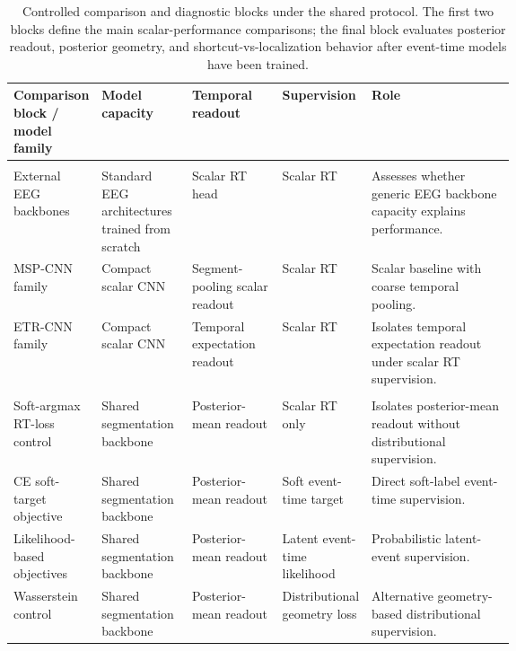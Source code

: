 \documentclass[12pt]{article}
\begin{document}
\begin{table}[!t]
\centering
\caption{Controlled comparison and diagnostic blocks under the shared protocol. The first two blocks define the main scalar-performance comparisons; the final block evaluates posterior readout, posterior geometry, and shortcut-vs-localization behavior after event-time models have been trained.}
\label{tab:experiment_map}
\scriptsize
\setlength{\tabcolsep}{2pt}
\renewcommand{\arraystretch}{1.08}
\begin{tabularx}{\linewidth}{@{} >{\RaggedRight\arraybackslash}p{0.15\linewidth} >{\RaggedRight\arraybackslash}p{0.18\linewidth} >{\RaggedRight\arraybackslash}p{0.18\linewidth} >{\RaggedRight\arraybackslash}p{0.14\linewidth} >{\RaggedRight\arraybackslash}X @{}}
\toprule
\textbf{Comparison block / model family} & \textbf{Model capacity} & \textbf{Temporal readout} & \textbf{Supervision} & \textbf{Role} \\
\midrule
\multicolumn{5}{@{}l}{\textit{Scalar regression controls}} \\
\addlinespace[0.15em]
External EEG backbones & Standard EEG architectures trained from scratch & Scalar RT head & Scalar RT & Assesses whether generic EEG backbone capacity explains performance. \\
MSP-CNN family & Compact scalar CNN & Segment-pooling scalar readout & Scalar RT & Scalar baseline with coarse temporal pooling. \\
ETR-CNN family & Compact scalar CNN & Temporal expectation readout & Scalar RT & Isolates temporal expectation readout under scalar RT supervision. \\
\midrule
\multicolumn{5}{@{}l}{\textit{Event-time objective comparison}} \\
\addlinespace[0.15em]
Soft-argmax RT-loss control & Shared segmentation backbone & Posterior-mean readout & Scalar RT only & Isolates posterior-mean readout without distributional supervision. \\
CE soft-target objective & Shared segmentation backbone & Posterior-mean readout & Soft event-time target & Direct soft-label event-time supervision. \\
Likelihood-based objectives & Shared segmentation backbone & Posterior-mean readout & Latent event-time likelihood & Probabilistic latent-event supervision. \\
Wasserstein control & Shared segmentation backbone & Posterior-mean readout & Distributional geometry loss & Alternative geometry-based distributional supervision. \\

\end{tabularx}
\end{table}
\end{document}
